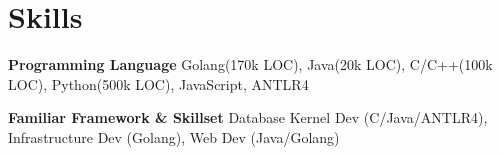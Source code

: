 \documentclass[letterpaper,10pt]{article}
\newcommand{\resumeItem}[2]{
  \item\small{
    \textbf{\:#1}{ #2 \vspace{-4pt}}
  }
}
\begin{document}
    
    
        
\section{Skills}

  	\resumeItem
      {Programming Language}
      {Golang(170k LOC), Java(20k LOC), C/C++(100k LOC), Python(500k LOC), JavaScript, ANTLR4}
    
    \resumeItem
      {Familiar Framework \& Skillset}
      {Database Kernel Dev (C/Java/ANTLR4), Infrastructure Dev (Golang), Web Dev (Java/Golang)}


\end{document}
